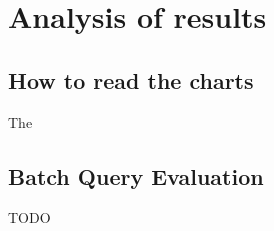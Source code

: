 \section{Analysis of results}


\subsection{How to read the charts}

The 

 
% 

\subsection{Batch Query Evaluation}

TODO

% 

% 


